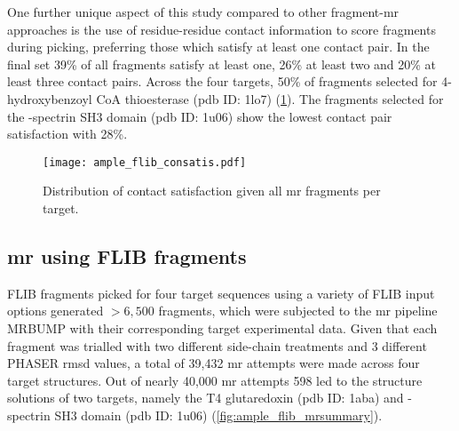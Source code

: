 One further unique aspect of this study compared to other fragment-\gls{mr} approaches is the use of residue-residue contact information to score fragments during picking, preferring those which satisfy at least one contact pair. In the final set 39\% of all fragments satisfy at least one, 26\% at least two and 20\% at least three contact pairs. Across the four targets, 50\% of fragments selected for 4-hydroxybenzoyl CoA thioesterase (\gls{pdb} ID: 1lo7) (\cref{fig:ample_flib_consatis}). The fragments selected for the \textalpha-spectrin SH3 domain (\gls{pdb} ID: 1u06) show the lowest contact pair satisfaction with 28\%.

\begin{figure}[H]
	\centering
	\texttt{[image: ample\_flib\_consatis.pdf]}
	\caption[Contact satisfaction of FLIB-derived fragments]{Distribution of contact satisfaction given all \gls{mr} fragments per target.}
	\label{fig:ample_flib_consatis}
\end{figure}




\subsection{\acrlong{mr} using FLIB fragments}
FLIB fragments picked for four target sequences using a variety of FLIB input options generated $>6,500$ fragments, which were subjected to the \gls{mr} pipeline MRBUMP with their corresponding target experimental data. Given that each fragment was trialled with two different side-chain treatments and 3 different PHASER \gls{rmsd} values, a total of 39,432 \gls{mr} attempts were made across four target structures. Out of nearly 40,000 \gls{mr} attempts 598 led to the structure solutions of two targets, namely the T4 glutaredoxin (\gls{pdb} ID: 1aba) and \textalpha-spectrin SH3 domain (\gls{pdb} ID: 1u06) (\cref{fig:ample_flib_mrsummary}).

